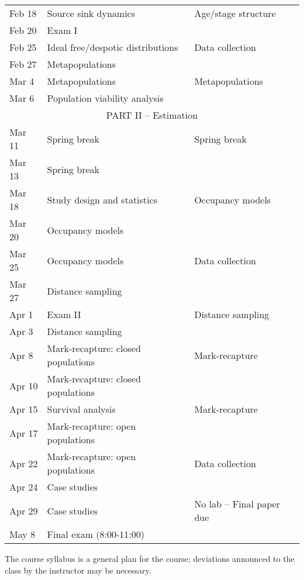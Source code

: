 \documentclass[11pt]{article}
\begin{document}
\begin{center}
\begin{tabular}[c]{lll}
\hline 
Feb 18     & Source sink dynamics               & Age/stage structure               \\
Feb 20     & Exam I                             &                                   \\
\hline
Feb 25     & Ideal free/despotic distributions  & Data collection                   \\
Feb 27     & Metapopulations                    &                                   \\
\hline
Mar 4      & Metapopulations                    & Metapopulations                   \\
Mar 6      & Population viability analysis      &                                   \\
\hline
           \multicolumn{3}{c}{PART II -- Estimation}                                \\
\hline
Mar 11     & Spring break                       & Spring break                      \\
Mar 13     & Spring break                       &                                   \\
\hline
Mar 18     & Study design and statistics        & Occupancy models                  \\
Mar 20     & Occupancy models                   &                                   \\
\hline
Mar 25     & Occupancy models                   & Data collection                   \\
Mar 27     & Distance sampling                  &                                   \\
\hline
Apr 1      & Exam II                            & Distance sampling                 \\
Apr 3      & Distance sampling                  &                                   \\
\hline
Apr 8      & Mark-recapture: closed populations & Mark-recapture                    \\
Apr 10     & Mark-recapture: closed populations &                                   \\
\hline
Apr 15     & Survival analysis                  & Mark-recapture                    \\
Apr 17     & Mark-recapture: open populations   &                                   \\
\hline
Apr 22     & Mark-recapture: open populations   & Data collection                   \\
Apr 24     & Case studies                       &                                   \\
\hline
Apr 29     & Case studies                       & No lab -- Final paper due         \\
\hline
May  8     & Final exam (8:00-11:00)            &                                   \\ 
\hline \hline
\end{tabular}
\end{center}

The course syllabus is a general plan for the course; deviations announced to the class by the instructor may be necessary.
\end{document}
